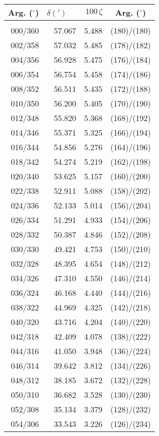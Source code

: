 \newpage
\begin{table}\centering
\small{ \begin{tabular}{rrrc}
Arg. ($^\circ$) & $\delta(')$~~ &  $100\,\zeta$ & Arg. ($^\circ$) \\\hline
&&&\\[-1.75ex]
000/360 & 57.067 &  5.488 & (180)/(180)\\
002/358 & 57.032 &  5.485 & (178)/(182)\\
004/356 & 56.928 &  5.475 & (176)/(184)\\
006/354 & 56.754 &  5.458 & (174)/(186)\\
008/352 & 56.511 &  5.435 & (172)/(188)\\
010/350 & 56.200 &  5.405 & (170)/(190)\\
012/348 & 55.820 &  5.368 & (168)/(192)\\
014/346 & 55.371 &  5.325 & (166)/(194)\\
016/344 & 54.856 &  5.276 & (164)/(196)\\
018/342 & 54.274 &  5.219 & (162)/(198)\\
020/340 & 53.625 &  5.157 & (160)/(200)\\
022/338 & 52.911 &  5.088 & (158)/(202)\\
024/336 & 52.133 &  5.014 & (156)/(204)\\
026/334 & 51.291 &  4.933 & (154)/(206)\\
028/332 & 50.387 &  4.846 & (152)/(208)\\
030/330 & 49.421 &  4.753 & (150)/(210)\\
032/328 & 48.395 &  4.654 & (148)/(212)\\
034/326 & 47.310 &  4.550 & (146)/(214)\\
036/324 & 46.168 &  4.440 & (144)/(216)\\
038/322 & 44.969 &  4.325 & (142)/(218)\\
040/320 & 43.716 &  4.204 & (140)/(220)\\
042/318 & 42.409 &  4.078 & (138)/(222)\\
044/316 & 41.050 &  3.948 & (136)/(224)\\
046/314 & 39.642 &  3.812 & (134)/(226)\\
048/312 & 38.185 &  3.672 & (132)/(228)\\
050/310 & 36.682 &  3.528 & (130)/(230)\\
052/308 & 35.134 &  3.379 & (128)/(232)\\
054/306 & 33.543 &  3.226 & (126)/(234)\\

\end{tabular}}
\end{table}
